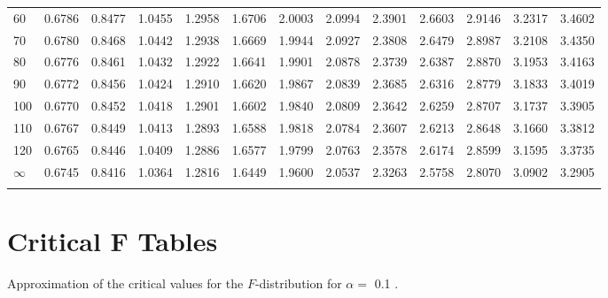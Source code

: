 {\begin{tabular}{m{6pt}|m{24pt}*{11}{m{24pt}}}
 60 & 0.6786 & 0.8477 & 1.0455 & 1.2958 & 1.6706 & 2.0003 & 2.0994 & 2.3901 & 2.6603 & 2.9146 & 3.2317 & 3.4602 \\[1pt] \arrayrulecolor{light-gray}\hline\arrayrulecolor{black}  
 70 & 0.6780 & 0.8468 & 1.0442 & 1.2938 & 1.6669 & 1.9944 & 2.0927 & 2.3808 & 2.6479 & 2.8987 & 3.2108 & 3.4350 \\[1pt] \arrayrulecolor{light-gray}\hline\arrayrulecolor{black}  
 80 & 0.6776 & 0.8461 & 1.0432 & 1.2922 & 1.6641 & 1.9901 & 2.0878 & 2.3739 & 2.6387 & 2.8870 & 3.1953 & 3.4163 \\[1pt] \arrayrulecolor{light-gray}\hline\arrayrulecolor{black}  
 90 & 0.6772 & 0.8456 & 1.0424 & 1.2910 & 1.6620 & 1.9867 & 2.0839 & 2.3685 & 2.6316 & 2.8779 & 3.1833 & 3.4019 \\[1pt] \arrayrulecolor{light-gray}\hline\arrayrulecolor{black}  
100 & 0.6770 & 0.8452 & 1.0418 & 1.2901 & 1.6602 & 1.9840 & 2.0809 & 2.3642 & 2.6259 & 2.8707 & 3.1737 & 3.3905 \\[1pt] \arrayrulecolor{light-gray}\hline\arrayrulecolor{black}  
110 & 0.6767 & 0.8449 & 1.0413 & 1.2893 & 1.6588 & 1.9818 & 2.0784 & 2.3607 & 2.6213 & 2.8648 & 3.1660 & 3.3812 \\[1pt] \arrayrulecolor{light-gray}\hline\arrayrulecolor{black}  
120 & 0.6765 & 0.8446 & 1.0409 & 1.2886 & 1.6577 & 1.9799 & 2.0763 & 2.3578 & 2.6174 & 2.8599 & 3.1595 & 3.3735 \\[1pt] \arrayrulecolor{light-gray}\hline\arrayrulecolor{black}  
$\infty$  & 0.6745 & 0.8416 & 1.0364 & 1.2816 & 1.6449 & 1.9600 & 2.0537 & 2.3263 & 2.5758 & 2.8070 & 3.0902 & 3.2905 \\[5pt] \arrayrulecolor{light-gray}\hline\arrayrulecolor{black}  
\end{tabular}
}


\section{Critical F Tables}

Approximation of the critical values for the $F$-distribution for $\alpha=$ 0.1 . 

